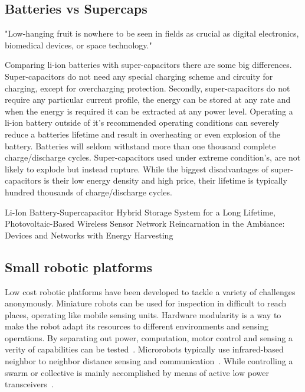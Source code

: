 \documentclass[letterpaper, 10 pt, conference]{ieeeconf}  %
\begin{document}
\subsection{Batteries vs Supercaps}

"Low-hanging fruit is nowhere to be seen in fields as crucial as digital electronics, biomedical devices, or space technology."
\cite{zachary_spec_2016}

Comparing li-ion batteries with super-capacitors there are some big differences.
Super-capacitors do not need any special charging scheme and circuity for charging, except for overcharging protection.
Secondly, super-capacitors do not require any particular current profile, the energy can be stored at any rate and when the energy is required it can be extracted at any power level.
Operating a li-ion battery outside of it's recommended operating conditions can severely reduce a batteries lifetime and result in overheating or even explosion of the battery.
Batteries will seldom withstand more than one thousand complete charge/discharge cycles.
Super-capacitors used under extreme condition's, are not likely to explode but instead rupture.
While the biggest disadvantages of super-capacitors is their low energy density and high price, their lifetime is typically hundred thousands of charge/discharge cycles.

Li-Ion Battery-Supercapacitor Hybrid Storage System for a Long Lifetime, Photovoltaic-Based Wireless Sensor Network	\cite{ongaro_pwre_2012}
Reincarnation in the Ambiance: Devices and Networks with Energy Harvesting \cite{prasad_comst_2014}



\subsection{Small robotic platforms}

Low cost robotic platforms have been developed to tackle a variety of challenges anonymously.
Miniature robots can be used for inspection in difficult to reach places, operating like mobile sensing units.
Hardware modularity is a way to make the robot adapt its resources to different environments and sensing operations.
By separating out power, computation, motor control and sensing a verity of capabilities can be tested~\cite{sabelhaus_icra_2013, pickem_icra_2015, kim_iros_2016}.
Microrobots typically use infrared-based neighbor to neighbor distance sensing and communication~\cite{rubenstein_icra_2012, pickem_icra_2015, kim_iros_2016}.
While controlling a swarm or collective is mainly accomplished by means of active low power transceivers~\cite{sabelhaus_icra_2013, pickem_icra_2015, kim_iros_2016}. 
\end{document}
